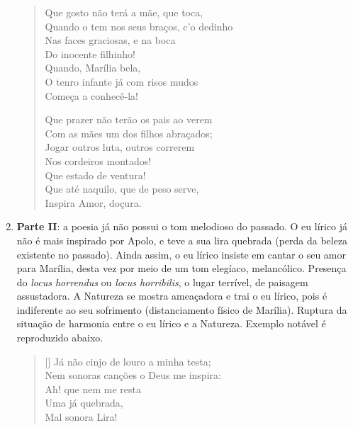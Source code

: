 \begin{enumerate}
\begin{verse}
Que gosto não terá a mãe, que toca, \\
Quando o tem nos seus braços, c’o dedinho \\
Nas faces graciosas, e na boca \\
\hspace{2em} Do inocente filhinho! \\
\hspace{2em} Quando, Marília bela, \\
O tenro infante já com risos mudos \\
\hspace{2em} Começa a conhecê-la!
						
Que prazer não terão os pais ao verem \\
Com as mães um dos filhos abraçados; \\
Jogar outros luta, outros correrem \\
\hspace{2em}Nos cordeiros montados! \\
\hspace{2em}Que estado de ventura! \\
Que até naquilo, que de peso serve, \\
\hspace{2em}Inspira Amor, doçura. \\
\end{verse}
\item \textbf{Parte II}: a poesia já não possui o tom melodioso do passado. O eu lírico já não é mais inspirado por Apolo, e teve a sua lira quebrada (perda da beleza existente no passado). Ainda assim, o eu lírico insiste em cantar o seu amor para Marília, desta vez por meio de um tom elegíaco, melancólico. Presença do \textit{locus horrendus} ou \textit{locus horribilis}, o lugar terrível, de paisagem assustadora. A Natureza se mostra ameaçadora e trai o eu lírico, pois é indiferente ao seu sofrimento (distanciamento físico de Marília). Ruptura da situação de harmonia entre o eu lírico e a Natureza. Exemplo notável é reproduzido abaixo.
\begin{verse}[\versewidth]
Já não cinjo de louro a minha testa; \\
Nem sonoras canções o Deus me inspira: \\
\hspace{2em} Ah! que nem me resta \\
\hspace{2em} Uma já quebrada, \\
\hspace{2em} Mal sonora Lira!
						

\end{verse}
\end{enumerate}
